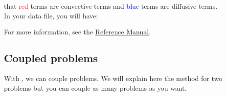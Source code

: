 \Note that \textcolor{red}{red} terms are convective terms and \textcolor{blue}{blue} terms are diffusive terms.\\

In your data file, you will have:

\begin{center}
\end{center}

For more information, see the \href{\REFERENCEMANUAL\#pbconduction}{\trustref Reference Manual}.

\subsection{Coupled problems}
With \trust, we can couple problems. We will explain here the method for two problems
but you can couple as many problems as you want.\\

